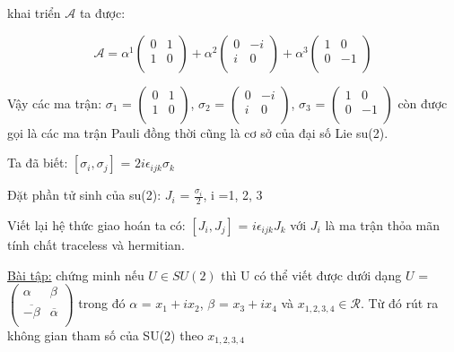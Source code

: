 \documentclass{report}
\begin{document}
khai triển \( \mathcal{A} \) ta được:

\[ \mathcal{A} = \alpha^{1} \begin{pmatrix}
	0 & 1 \\
	1 & 0 \\
	\end{pmatrix} + \alpha^{2} \begin{pmatrix}
	0 & -i \\
	i & 0 \\
	\end{pmatrix} + \alpha^{3} \begin{pmatrix}
	1 & 0 \\
	0 & -1 \\
	\end{pmatrix} \]
	
Vậy các ma trận: \( \sigma_{1} \) = \( \begin{pmatrix}
	0 & 1 \\
	1 & 0 \\
	\end{pmatrix} \), \( \sigma_{2} \) = \( \begin{pmatrix}
	0 & -i \\
	i & 0 \\
	\end{pmatrix} \), \( \sigma_{3} \) = \(  \begin{pmatrix}
	1 & 0 \\
	0 & -1 \\
	\end{pmatrix} \) còn được gọi là các ma trận Pauli đồng thời cũng là cơ sở của đại số Lie su(2).
	
Ta đã biết: \( [\sigma_{i},\sigma_{j}] \) = \(2i \epsilon_{ijk} \sigma_{k} \)

Đặt phần tử sinh của su(2): \( J_{i}\) = \( \frac{\sigma_{i}}{2} \), i =1, 2, 3
	
Viết lại hệ thức giao hoán ta có: \( [J_{i},J_{j}] \) = \(i \epsilon_{ijk} J_{k} \) với \(J_{i}\) là ma trận thỏa mãn tính chất traceless và hermitian.

\underline{Bài tập:} chứng minh nếu \( U \in SU(2) \) thì U có thể viết được dưới dạng \( U \) = \(  \begin{pmatrix}
	\alpha & \beta \\
	\overline{-\beta} & \overline{\alpha} \\
	\end{pmatrix} \) trong đó \(\alpha\) = \( x_{1} + i x_{2} \), \(\beta\) = \( x_{3} + i x_{4} \) và \( x_{1, 2, 3, 4} \in \mathcal{R} \). Từ đó rút ra không gian tham số của SU(2) theo \( x_{1, 2, 3, 4} \) 
	
\end{document}
